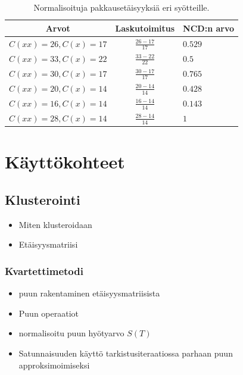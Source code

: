 \documentclass[12pt,finnish,draft]{tktltiki2}
\theoremstyle{definition}
\theoremstyle{remark}
\begin{document}
  \begin{table}[t]
    \centering
    \begin{tabular}{c|c|l}
      Arvot                    & Laskutoimitus      & NCD:n arvo \\ \hline
      $ C(xx) = 26, C(x) = 17$ & $\frac{26-17}{17} $ & $0.529$    \\ \hline
      $ C(xx) = 33, C(x) = 22$ & $\frac{33-22}{22} $ & $0.5$      \\ \hline
      $ C(xx) = 30, C(x) = 17$ & $\frac{30-17}{17} $ & $0.765$    \\ \hline
      $ C(xx) = 20, C(x) = 14$ & $\frac{20-14}{14} $ & $0.428$    \\ \hline
      $ C(xx) = 16, C(x) = 14$ & $\frac{16-14}{14} $ & $0.143$    \\ \hline
      $ C(xx) = 28, C(x) = 14$ & $\frac{28-14}{14} $ & $1$        \\
    \end{tabular}
    \caption{Normalisoituja pakkausetäisyyksiä eri syötteille.}
    \label{tab:NCD-values}
  \end{table}


\section{Käyttökohteet} %
\label{sec:k_ytt_kohteet}
  \subsection{Klusterointi} %
  \label{sub:klusterointi}
    \begin{itemize}
      \item Miten klusteroidaan
      \item Etäisyysmatriisi
    \end{itemize}
    \subsubsection{Kvartettimetodi} %
    \label{ssub:quartet_metodi}

    \begin{itemize}
      \item puun rakentaminen etäisyysmatriisista
      \item Puun operaatiot
      \item normalisoitu puun hyötyarvo $S(T)$
      \item Satunnaisuuden käyttö tarkistusiteraatiossa parhaan puun approksimoimiseksi
    \end{itemize}
\end{document}

